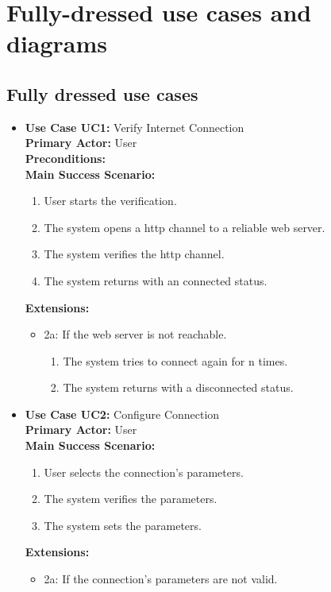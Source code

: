\documentclass[
	a4paper,					10pt,							twoside,					openright,				notitlepage,			parskip=half,			]{scrreprt}
\begin{document}
\chapter{Fully-dressed use cases and diagrams}
\label{chap:usecases-ssd}

\section{Fully dressed use cases}
\label{subsubsec:api_apistruct_usecases_full}
\begin{itemize}
\item\textbf{Use Case UC1:} Verify Internet Connection\\
\textbf{Primary Actor:} User\\
\textbf{Preconditions: } \\
\textbf{Main Success Scenario:}
	\begin{enumerate}
	\item User starts the verification.
	\item The system opens a http channel to a reliable web server.
	\item The system verifies the http channel.
	\item The system returns with an connected status.
	\end{enumerate}
\textbf{Extensions:}
	\begin{itemize}
	\item 2a: If the web server is not reachable.
		\begin{enumerate}
			\item The system tries to connect again for n times.
			\item The system returns with a disconnected status.
		\end{enumerate}
	\end{itemize}
\item\textbf{Use Case UC2:} Configure Connection\\
\textbf{Primary Actor:} User\\
\textbf{Main Success Scenario:}
	\begin{enumerate}
	\item User selects the connection's parameters.
	\item The system verifies the parameters.
	\item The system sets the parameters.
	\end{enumerate}
\textbf{Extensions:}
	\begin{itemize}
	\item 2a: If the connection's parameters are not valid.

\end{itemize}
\end{itemize}
\end{document}
